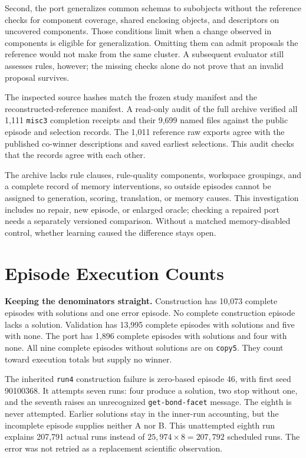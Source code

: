 \documentclass[10pt,letterpaper]{article}
\begin{document}
Second, the port generalizes common schemas to subobjects without the reference checks for
component coverage, shared enclosing objects, and descriptors on uncovered components.
Those conditions limit when a change observed in components is eligible for
generalization. Omitting them can admit proposals the reference would not make from the
same cluster. A subsequent evaluator still assesses rules, however; the missing checks
alone do not prove that an invalid proposal survives.

The inspected source hashes match the frozen study manifest and the
reconstructed-reference manifest. A read-only audit of the full archive verified all 1,111
\texttt{misc3} completion receipts and their 9,699 named files against the public episode
and selection records. The 1,011 reference raw exports agree with the published co-winner
descriptions and saved earliest selections. This audit checks that the records agree with
each other.

The archive lacks rule clauses, rule-quality components, workspace groupings, and a
complete record of memory interventions, so outside episodes cannot be assigned to
generation, scoring, translation, or memory causes. This investigation includes no repair,
new episode, or enlarged oracle; checking a repaired port needs a separately versioned
comparison. Without a matched memory-disabled control, whether learning caused the
difference stays open.

\clearpage

\section{Episode Execution Counts}\label{app:episodic-comparisons}

\textbf{Keeping the denominators straight.} Construction has 10,073 complete episodes with
solutions and one error episode. No complete construction episode lacks a solution.
Validation has 13,995 complete episodes with solutions and five with none. The port has
1,896 complete episodes with solutions and four with none. All nine complete episodes
without solutions are on \texttt{copy5}. They count toward execution totals but supply no
winner.



The inherited \texttt{run4} construction failure is zero-based episode 46, with first seed
90100368. It attempts seven runs: four produce a solution, two stop without one, and the
seventh raises an unrecognized \texttt{get-bond-facet} message. The eighth is never
attempted. Earlier solutions stay in the inner-run accounting, but the incomplete episode
supplies neither A nor B. This unattempted eighth run explains 207,791 actual runs instead
of \(25,974\times8=207,792\) scheduled runs. The error was not retried as a replacement
scientific observation.
\end{document}
